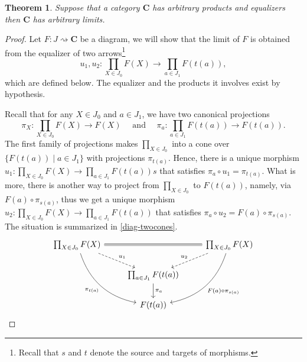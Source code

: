\documentclass{article}
\newtheorem{thm}{Theorem}
\theoremstyle{definition}
\theoremstyle{remark}
\begin{document}
\begin{thm}
    Suppose that a category $\mathbf{C}$ has arbitrary products and equalizers then $\mathbf{C}$ has arbitrary limits.
\end{thm}
\begin{proof}
    Let $F: J\rightsquigarrow \mathbf{C}$ be a diagram, we will show that the limit of $F$ is obtained from the equalizer of two arrows\footnote{Recall that $s$ and $t$ denote the source and targets of morphisms.}
    \[u_1, u_2: \prod_{X \in J_0} F(X) \rightarrow \prod_{a \in J_1} F(t(a)),\]
    which are defined below. The equalizer and the products it involves exist by hypothesis.
    
    Recall that for any $X \in J_0$ and $a \in J_1$, we have two  canonical projections \[\pi_X:\prod_{X \in J_0}F(X)\rightarrow F(X) \quad \text{ and }\quad \pi_a:\prod_{a \in J_1} F(t(a)) \rightarrow F(t(a)).\]
    The first family of projections makes $\prod_{X \in J_0}$ into a cone over $\{F(t(a)) \mid a \in J_1\}$ with projections $\pi_{t(a)}$. Hence, there is a unique morphism $u_1:\prod_{X \in J_0} F(X) \rightarrow \prod_{a \in J_1}F(t(a))s$ that satisfies $\pi_a \circ u_1 = \pi_{t(a)}$. What is more, there is another way to project from $\prod_{X \in J_0}$ to $F(t(a))$, namely, via $F(a) \circ \pi_{s(a)}$, thus we get a unique morphism $u_2:\prod_{X \in J_0} F(X) \rightarrow \prod_{a \in J_1}F(t(a))$ that satisfies $\pi_a \circ u_2 = F(a) \circ \pi_{s(a)}$. The situation is summarized in \eqref{diag-twocones}.
    \begin{equation}\label{diag-twocones}
        \begin{tikzcd}
            \prod_{X \in J_0} F(X) \arrow[rdd, "\pi_{t(a)}"', bend right] \arrow[rd, "u_1", dashed] \arrow[rr, equal] & & \prod_{X \in J_0} F(X) \arrow[ldd, "F(a) \circ \pi_{s(a)}", bend left] \arrow[ld, "u_2"', dashed] \\& \prod_{a \in J_1} F(t(a)) \arrow[d, "\pi_{a}"] &\\ & F(t(a)) &         
            \end{tikzcd}
    \end{equation}
    

\end{proof}
\end{document}
